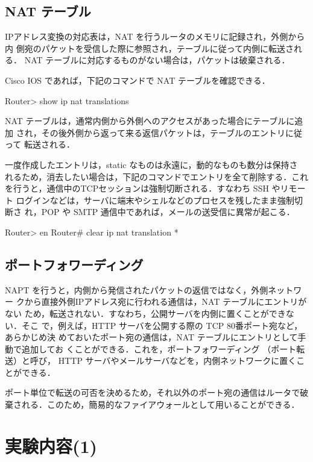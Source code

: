 \subsection*{NAT テーブル}

IPアドレス変換の対応表は，NAT を行うルータのメモリに記録され，外側から内
側宛のパケットを受信した際に参照され，テーブルに従って内側に転送される．
NAT テーブルに対応するものがない場合は，パケットは破棄される．

Cisco IOS であれば，下記のコマンドで NAT テーブルを確認できる．

\begin{cli}
Router> show ip nat translations 
\end{cli}

NAT テーブルは，通常内側から外側へのアクセスがあった場合にテーブルに追加
され，その後外側から返って来る返信パケットは，テーブルのエントリに従って
転送される．

一度作成したエントリは，static なものは永遠に，動的なものも数分は保持さ
れるため，消去したい場合は，下記のコマンドでエントリを全て削除する．これ
を行うと，通信中のTCPセッションは強制切断される．すなわち SSH やリモート
ログインなどは，サーバに端末やシェルなどのプロセスを残したまま強制切断さ
れ，POP や SMTP 通信中であれば，メールの送受信に異常が起こる．

\begin{cli}
Router> en
Router# clear ip nat translation *
\end{cli}

\subsection{ポートフォワーディング}

NAPT を行うと，内側から発信されたパケットの返信ではなく，外側ネットワー
クから直接外側IPアドレス宛に行われる通信は，NAT テーブルにエントリがない
ため，転送されない．すなわち，公開サーバを内側に置くことができない．そこ
で，例えば，HTTP サーバを公開する際の TCP 80番ポート宛など，あらかじめ決
めておいたポート宛の通信は，NAT テーブルにエントリとして手動で追加してお
くことができる．これを，ポートフォワーディング （ポート転送）と呼び，
HTTP サーバやメールサーバなどを，内側ネットワークに置くことができる．

ポート単位で転送の可否を決めるため，それ以外のポート宛の通信はルータで破
棄される．このため，簡易的なファイアウォールとして用いることができる．

\clearpage

\section{実験内容(1)}

